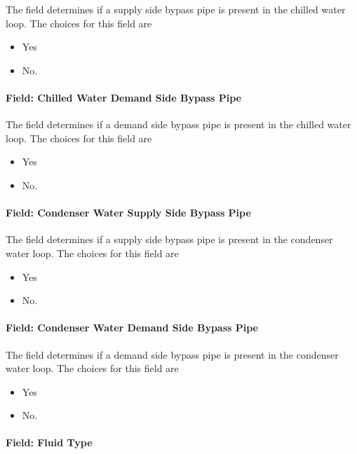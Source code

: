 The field determines if a supply side bypass pipe is present in the chilled water loop. The choices for this field are

\begin{itemize}
\item
  Yes
\item
  No.
\end{itemize}

\paragraph{Field: Chilled Water Demand Side Bypass Pipe}\label{field-chilled-water-demand-side-bypass-pipe}

The field determines if a demand side bypass pipe is present in the chilled water loop. The choices for this field are

\begin{itemize}
\item
  Yes
\item
  No.
\end{itemize}

\paragraph{Field: Condenser Water Supply Side Bypass Pipe}\label{field-condenser-water-supply-side-bypass-pipe}

The field determines if a supply side bypass pipe is present in the condenser water loop. The choices for this field are

\begin{itemize}
\item
  Yes
\item
  No.
\end{itemize}

\paragraph{Field: Condenser Water Demand Side Bypass Pipe}\label{field-condenser-water-demand-side-bypass-pipe}

The field determines if a demand side bypass pipe is present in the condenser water loop. The choices for this field are

\begin{itemize}
\item
  Yes
\item
  No.
\end{itemize}

\paragraph{Field: Fluid Type}\label{field-fluid-type-000}

